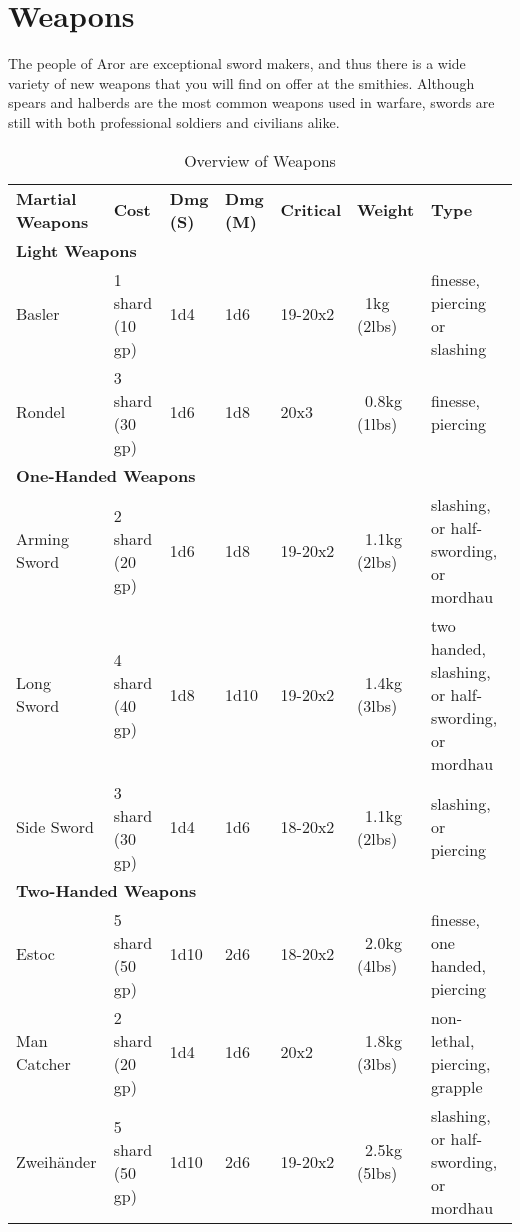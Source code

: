 \section{Weapons}
\label{sec:Weapons}

The people of Aror are exceptional sword makers, and thus there is a wide
variety of new weapons that you will find on offer at the smithies. Although
spears and halberds are the most common weapons used in warfare, swords are
still with both professional soldiers and civilians alike.

\begin{table*}[!htb]
  \caption{Overview of Weapons}
  \begin{tabular}{p{2.5cm}     l               p{1cm}             p{1cm}             p{1.5cm}            p{2cm}          p{3.0cm}}
    \textbf{Martial Weapons} & \textbf{Cost} & \textbf{Dmg (S)} & \textbf{Dmg (M)} & \textbf{Critical} & \textbf{Weight} & \textbf{Type} \\
    \multicolumn{7}{l}{\large{\textbf{Light Weapons}}} \\
    Basler       & 1 shard (10 gp) & 1d4  & 1d6  & 19-20x2 & ~1kg (2lbs)   & finesse, piercing or slashing \\
    Rondel       & 3 shard (30 gp) & 1d6  & 1d8  &    20x3 & ~0.8kg (1lbs) & finesse, piercing \\
    \multicolumn{7}{l}{\large{\textbf{One-Handed Weapons}}} \\
    Arming Sword & 2 shard (20 gp) & 1d6  & 1d8  & 19-20x2 & ~1.1kg (2lbs) & slashing, or half-swording, or mordhau \\
    Long Sword   & 4 shard (40 gp) & 1d8  & 1d10 & 19-20x2 & ~1.4kg (3lbs) & two handed, slashing, or half-swording, or mordhau \\
    Side Sword   & 3 shard (30 gp) & 1d4  & 1d6  & 18-20x2 & ~1.1kg (2lbs) & slashing, or piercing \\
    \multicolumn{7}{l}{\large{\textbf{Two-Handed Weapons}}} \\
    Estoc        & 5 shard (50 gp) & 1d10 & 2d6  & 18-20x2 & ~2.0kg (4lbs) & finesse, one handed, piercing \\
    Man Catcher  & 2 shard (20 gp) & 1d4  & 1d6  & 20x2    & ~1.8kg (3lbs) & non-lethal, piercing, grapple \\
    Zweihänder   & 5 shard (50 gp) & 1d10 & 2d6  & 19-20x2 & ~2.5kg (5lbs) & slashing, or half-swording, or mordhau \\
  \end{tabular}
\end{table*}

